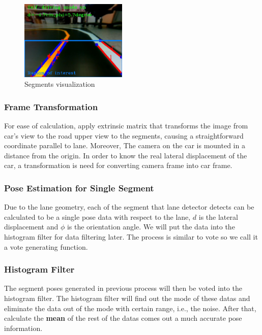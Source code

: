 \documentclass[conference]{IEEEtran}
\begin{document}
\begin{figure}
	\centering
	\includegraphics[width=2in]{img/lane_detect.png}
	\caption{Segments visualization}
	\label{fig:lane_detect}
\end{figure}

\subsubsection{Frame Transformation}

For ease of calculation, apply extrinsic matrix that transforms the image from car's view to the road upper view  to the segments, causing a straightforward coordinate parallel to lane.
Moreover, The camera on the car is mounted in a distance from the origin. In order to know the real lateral displacement of the car, a transformation is need for converting camera frame into car frame.

\subsubsection{Pose Estimation for Single Segment}

Due to the lane geometry, each of the segment that lane detector detects can be calculated to be a single pose data with respect to the lane, $d$ is the lateral displacement and $\phi$ is the orientation angle. We will put the data into the histogram filter for data filtering later. The process is similar to vote so we call it a vote generating function.

\subsubsection{Histogram Filter}

The segment poses generated in previous process will then be voted into the histogram filter. The histogram filter will find out the mode of these datas and eliminate the data out of the mode with certain range, i.e., the noise. After that, calculate the \textbf{mean} of the rest of the datas comes out a much accurate pose information.
\end{document}
